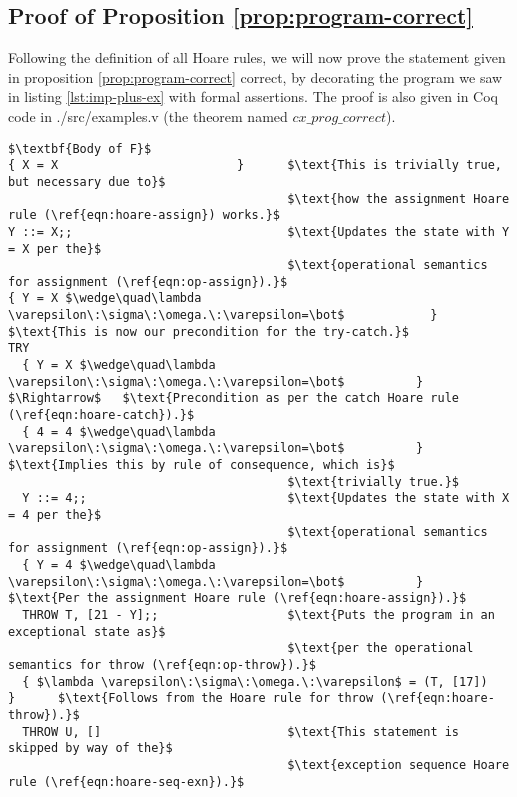 \subsection{Proof of Proposition \ref{prop:program-correct}}

Following the definition of all Hoare rules, we will now prove the statement given in proposition \ref{prop:program-correct} correct, by decorating the program we saw in listing \ref{lst:imp-plus-ex} with formal assertions. The proof is also given in Coq code in ./src/examples.v (the theorem named $cx\_prog\_correct$).

\begin{lstlisting}[mathescape=true,keepspaces=true,label=lst:hoare_ex_asgn,caption=Decorated variant of the program from listing \ref{lst:imp-plus-ex}.]
$\textbf{Body of F}$
{ X = X                         }      $\text{This is trivially true, but necessary due to}$
                                       $\text{how the assignment Hoare rule (\ref{eqn:hoare-assign}) works.}$
Y ::= X;;                              $\text{Updates the state with Y = X per the}$
                                       $\text{operational semantics for assignment (\ref{eqn:op-assign}).}$
{ Y = X $\wedge\quad\lambda \varepsilon\:\sigma\:\omega.\:\varepsilon=\bot$            }      $\text{This is now our precondition for the try-catch.}$
TRY
  { Y = X $\wedge\quad\lambda \varepsilon\:\sigma\:\omega.\:\varepsilon=\bot$          } $\Rightarrow$   $\text{Precondition as per the catch Hoare rule (\ref{eqn:hoare-catch}).}$
  { 4 = 4 $\wedge\quad\lambda \varepsilon\:\sigma\:\omega.\:\varepsilon=\bot$          }      $\text{Implies this by rule of consequence, which is}$
                                       $\text{trivially true.}$
  Y ::= 4;;                            $\text{Updates the state with X = 4 per the}$
                                       $\text{operational semantics for assignment (\ref{eqn:op-assign}).}$
  { Y = 4 $\wedge\quad\lambda \varepsilon\:\sigma\:\omega.\:\varepsilon=\bot$          }      $\text{Per the assignment Hoare rule (\ref{eqn:hoare-assign}).}$
  THROW T, [21 - Y];;                  $\text{Puts the program in an exceptional state as}$
                                       $\text{per the operational semantics for throw (\ref{eqn:op-throw}).}$
  { $\lambda \varepsilon\:\sigma\:\omega.\:\varepsilon$ = (T, [17])          }      $\text{Follows from the Hoare rule for throw (\ref{eqn:hoare-throw}).}$
  THROW U, []                          $\text{This statement is skipped by way of the}$
                                       $\text{exception sequence Hoare rule (\ref{eqn:hoare-seq-exn}).}$

\end{lstlisting}
